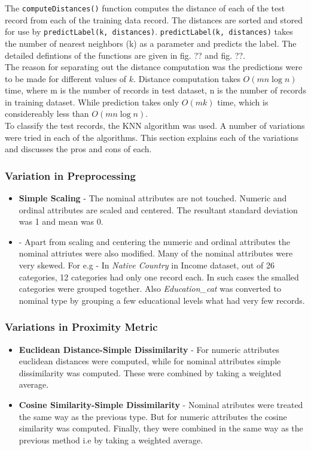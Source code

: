 The \texttt{computeDistances()} function computes the distance of each of the test record from each of the training data record. The distances are sorted and stored for use by \texttt{predictLabel(k, distances)}. \texttt{predictLabel(k, distances)} takes the number of nearest neighbors (k) as a parameter and predicts the label. The detailed defintions of the functions are given in fig. ?? and fig. ??. \\

The reason for separating out the distance computation was the predictions were to be made for different values of $k$. Distance computation takes $O(mn\log n)$ time, where m is the number of records in test dataset, n is the number of records in training dataset. While prediction takes only $O(mk)$ time, which is considereably less than $O(mn\log n)$.\\
To classify the test records, the KNN algorithm was used. A number of variations were tried in each of the algorithms. This section explains each of the variations and discusses the pros and cons of each.
\subsubsection{Variation in Preprocessing}
 \begin{itemize}
 	\item \textbf{Simple Scaling} - The nominal attributes are not touched. Numeric and ordinal attributes are scaled and centered. The resultant standard deviation was 1 and mean was 0.
 	\item {} - Apart from scaling and centering the numeric and ordinal attributes the nominal attriutes were also modified. Many of the nominal attributes were very skewed. For e.g - In \emph{Native Country} in Income dataset, out of 26 categories, 12 categories had only one record each. In such cases the smalled categories were grouped together. Also \emph{Education\_cat} was converted to nominal type by grouping a few educational levels what had very few records.
 \end{itemize}
 \subsubsection{Variations in Proximity Metric}
 \begin{itemize}
 	\item \textbf{Euclidean Distance-Simple Dissimilarity} - For numeric attributes euclidean distances were computed, while for nominal attributes simple dissimilarity was computed. These were combined by taking a weighted average.
 	\item \textbf{Cosine Similarity-Simple Dissimilarity} - Nominal atributes were treated the same way as the previous type. But for numeric attributes the cosine similarity was computed. Finally, they were combined in the same way as the previous method i.e by taking a weighted average.
 \end{itemize}
